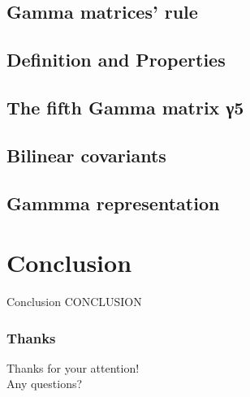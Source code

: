 \documentclass[serif,11pt]{beamer}
\begin{document}
\subsection{Gamma matrices’ rule}

\subsection{Definition and Properties}

\subsection{The fifth Gamma matrix γ5}

\subsection{Bilinear covariants}

\subsection{Gammma representation}

\section{Conclusion}
\begin{frame}{Conclusion}
CONCLUSION
\end{frame}




\begin{frame}\frametitle{Thanks}
\centering

Thanks for your attention!\\
Any questions?
\end{frame}



\end{document}
